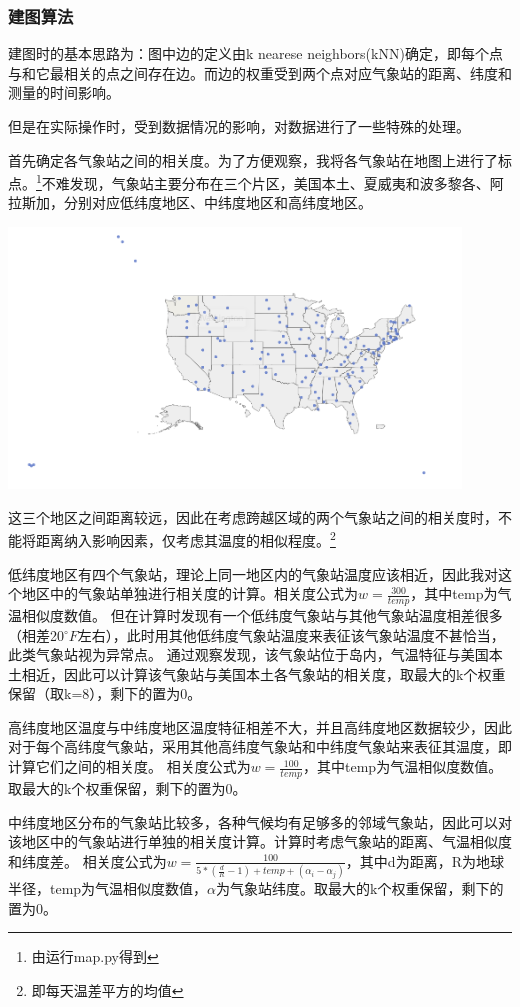 \documentclass[a4paper]{ctexart}
\begin{document}
\subsubsection{建图算法}

建图时的基本思路为：图中边的定义由k nearese neighbors(kNN)确定，即每个点与和它最相关的点之间存在边。\cite{qiao2018data}而边的权重受到两个点对应气象站的距离、纬度和测量的时间影响。

但是在实际操作时，受到数据情况的影响，对数据进行了一些特殊的处理。

首先确定各气象站之间的相关度。为了方便观察，我将各气象站在地图上进行了标点。\footnote{由运行map.py得到}不难发现，气象站主要分布在三个片区，美国本土、夏威夷和波多黎各、阿拉斯加，分别对应低纬度地区、中纬度地区和高纬度地区。

\includegraphics[width=0.9\textwidth]{map.png}

这三个地区之间距离较远，因此在考虑跨越区域的两个气象站之间的相关度时，不能将距离纳入影响因素，仅考虑其温度的相似程度。\footnote{即每天温差平方的均值}

低纬度地区有四个气象站，理论上同一地区内的气象站温度应该相近，因此我对这个地区中的气象站单独进行相关度的计算。相关度公式为$w=\frac{300}{temp}$，其中temp为气温相似度数值。
但在计算时发现有一个低纬度气象站与其他气象站温度相差很多（相差20$^\circ F$左右），此时用其他低纬度气象站温度来表征该气象站温度不甚恰当，此类气象站视为异常点。
通过观察发现，该气象站位于岛内，气温特征与美国本土相近，因此可以计算该气象站与美国本土各气象站的相关度，取最大的k个权重保留（取k=8），剩下的置为0。

高纬度地区温度与中纬度地区温度特征相差不大，并且高纬度地区数据较少，因此对于每个高纬度气象站，采用其他高纬度气象站和中纬度气象站来表征其温度，即计算它们之间的相关度。
相关度公式为$w=\frac{100}{temp}$，其中temp为气温相似度数值。取最大的k个权重保留，剩下的置为0。

中纬度地区分布的气象站比较多，各种气候均有足够多的邻域气象站，因此可以对该地区中的气象站进行单独的相关度计算。计算时考虑气象站的距离、气温相似度和纬度差。
相关度公式为$w=\frac{100}{5*(\frac{d}{R}-1)+temp+(\alpha_i-\alpha_j ) }$，其中d为距离，R为地球半径，temp为气温相似度数值，$\alpha$为气象站纬度。取最大的k个权重保留，剩下的置为0。
\end{document}

